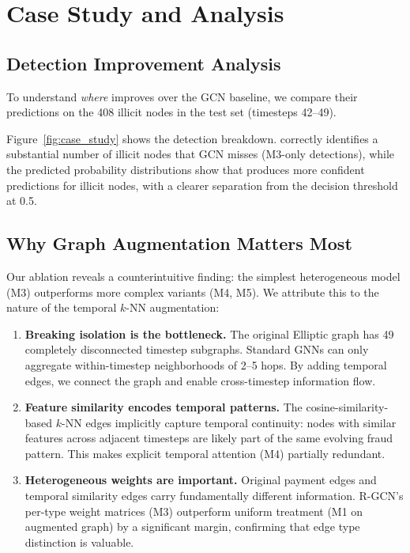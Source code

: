 \section{Case Study and Analysis}

\subsection{Detection Improvement Analysis}

To understand \emph{where} \ours{} improves over the GCN baseline, we compare their predictions on the 408 illicit nodes in the test set (timesteps 42--49).

Figure~\ref{fig:case_study} shows the detection breakdown. \ours{} correctly identifies a substantial number of illicit nodes that GCN misses (M3-only detections), while the predicted probability distributions show that \ours{} produces more confident predictions for illicit nodes, with a clearer separation from the decision threshold at 0.5.

\subsection{Why Graph Augmentation Matters Most}

Our ablation reveals a counterintuitive finding: the simplest heterogeneous model (M3) outperforms more complex variants (M4, M5). We attribute this to the nature of the temporal $k$-NN augmentation:

\begin{enumerate}
    \item \textbf{Breaking isolation is the bottleneck.} The original Elliptic graph has 49 completely disconnected timestep subgraphs. Standard GNNs can only aggregate within-timestep neighborhoods of 2--5 hops. By adding temporal edges, we connect the graph and enable cross-timestep information flow.

    \item \textbf{Feature similarity encodes temporal patterns.} The cosine-similarity-based $k$-NN edges implicitly capture temporal continuity: nodes with similar features across adjacent timesteps are likely part of the same evolving fraud pattern. This makes explicit temporal attention (M4) partially redundant.

    \item \textbf{Heterogeneous weights are important.} Original payment edges and temporal similarity edges carry fundamentally different information. R-GCN's per-type weight matrices (M3) outperform uniform treatment (M1 on augmented graph) by a significant margin, confirming that edge type distinction is valuable.
\end{enumerate}

